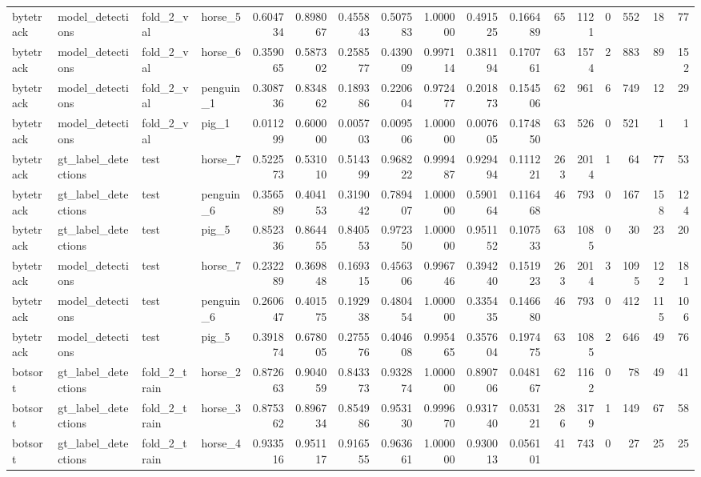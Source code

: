 \begin{table}
\begin{tabular}{llllrrrrrrrrrrrrr}
bytetrack & model_detections & fold_2_val & horse_5 & 0.604734 & 0.898067 & 0.455843 & 0.507583 & 1.000000 & 0.491525 & 0.166489 & 65 & 1121 & 0 & 552 & 18 & 77 \\
bytetrack & model_detections & fold_2_val & horse_6 & 0.359065 & 0.587302 & 0.258577 & 0.439009 & 0.997114 & 0.381194 & 0.170761 & 63 & 1574 & 2 & 883 & 89 & 152 \\
bytetrack & model_detections & fold_2_val & penguin_1 & 0.308736 & 0.834862 & 0.189386 & 0.220604 & 0.972477 & 0.201873 & 0.154506 & 62 & 961 & 6 & 749 & 12 & 29 \\
bytetrack & model_detections & fold_2_val & pig_1 & 0.011299 & 0.600000 & 0.005703 & 0.009506 & 1.000000 & 0.007605 & 0.174850 & 63 & 526 & 0 & 521 & 1 & 1 \\
bytetrack & gt_label_detections & test & horse_7 & 0.522573 & 0.531010 & 0.514399 & 0.968222 & 0.999487 & 0.929494 & 0.111221 & 263 & 2014 & 1 & 64 & 77 & 53 \\
bytetrack & gt_label_detections & test & penguin_6 & 0.356589 & 0.404153 & 0.319042 & 0.789407 & 1.000000 & 0.590164 & 0.116468 & 46 & 793 & 0 & 167 & 158 & 124 \\
bytetrack & gt_label_detections & test & pig_5 & 0.852336 & 0.864455 & 0.840553 & 0.972350 & 1.000000 & 0.951152 & 0.107533 & 63 & 1085 & 0 & 30 & 23 & 20 \\
bytetrack & model_detections & test & horse_7 & 0.232289 & 0.369848 & 0.169315 & 0.456306 & 0.996746 & 0.394240 & 0.151923 & 263 & 2014 & 3 & 1095 & 122 & 181 \\
bytetrack & model_detections & test & penguin_6 & 0.260647 & 0.401575 & 0.192938 & 0.480454 & 1.000000 & 0.335435 & 0.146680 & 46 & 793 & 0 & 412 & 115 & 106 \\
bytetrack & model_detections & test & pig_5 & 0.391874 & 0.678005 & 0.275576 & 0.404608 & 0.995465 & 0.357604 & 0.197475 & 63 & 1085 & 2 & 646 & 49 & 76 \\
botsort & gt_label_detections & fold_2_train & horse_2 & 0.872663 & 0.904059 & 0.843373 & 0.932874 & 1.000000 & 0.890706 & 0.048167 & 62 & 1162 & 0 & 78 & 49 & 41 \\
botsort & gt_label_detections & fold_2_train & horse_3 & 0.875362 & 0.896734 & 0.854986 & 0.953130 & 0.999670 & 0.931740 & 0.053121 & 286 & 3179 & 1 & 149 & 67 & 58 \\
botsort & gt_label_detections & fold_2_train & horse_4 & 0.933516 & 0.951117 & 0.916555 & 0.963661 & 1.000000 & 0.930013 & 0.056101 & 41 & 743 & 0 & 27 & 25 & 25 \\

\end{tabular}
\end{table}
